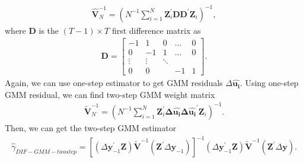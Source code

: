\documentclass[12pt,a4paper,hyperref]{article}
\begin{document}
\begin{align}
\boldsymbol{\hat{V}}_{N}^{-1}= \left(N^{-1} \sum_{i=1}^{N} \boldsymbol{Z}_{i}^{'} \boldsymbol{DD}^{'}  \boldsymbol{Z}_{i} \right)^{-1},
\end{align}
where $\boldsymbol{D}$ is the $(T-1)\times T$ first difference matrix as
\begin{align}
\boldsymbol{D}=
\begin{bmatrix}
-1     & 1      &0       &\ldots   & 0 \\
0      & -1     & 1      &\ldots   & 0  \\
\vdots &\vdots  &\ddots  &         &  \\
0      &  0     &        &  -1     & 1
\end{bmatrix}.
\end{align}
 Again, we can use one-step estimator to get GMM residuals $\Delta \hat{\boldsymbol{u_{i}}}$. Using one-step GMM residual, we can find two-step GMM weight matrix
\begin{align}
\boldsymbol{\tilde{V}}_{N}^{-1}=\left(N^{-1}\sum_{i=1}^{N} \boldsymbol{Z}_{i}^{'} \boldsymbol{\Delta \hat{u_{i}}} \boldsymbol{\Delta \hat{u_{i}}^{'}} \boldsymbol{Z}_{i} \right)^{-1} .
\end{align}
 Then, we can get the two-step GMM estimator
\begin{align}
\hat{\gamma}_{DIF-GMM-twostep}=\left[ \left(\Delta \boldsymbol{y}_{-1}^{'} \boldsymbol{Z} \right)\boldsymbol{\tilde{V}}^{-1}\left( \boldsymbol{Z}^{'}\Delta \boldsymbol{y}_{-1}  \right) \right]^{-1}\left(\Delta \boldsymbol{y}_{-1}^{'} \boldsymbol{Z} \right)\boldsymbol{\tilde{V}}^{-1}\left( \boldsymbol{Z}^{'}\Delta \boldsymbol{y}  \right).
\end{align}
\end{document}
